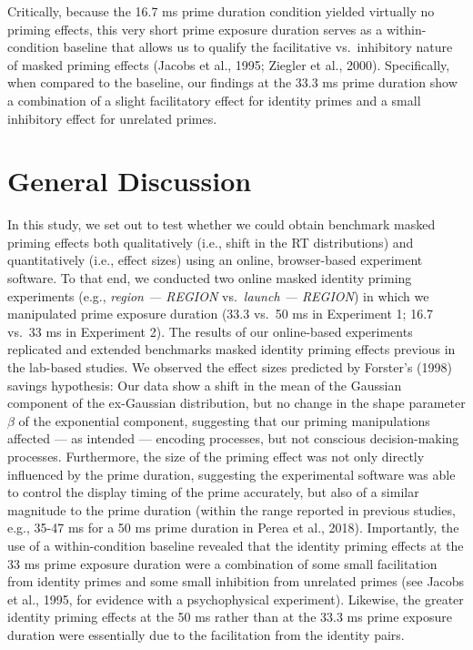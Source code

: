 \documentclass[
  english,
  man,floatsintext]{apa6}
\begin{document}
Critically, because the 16.7 ms prime duration condition yielded virtually no priming effects, this very short prime exposure duration serves as a within-condition baseline that allows us to qualify the facilitative vs.~inhibitory nature of masked priming effects (Jacobs et al., 1995; Ziegler et al., 2000). Specifically, when compared to the baseline, our findings at the 33.3 ms prime duration show a combination of a slight facilitatory effect for identity primes and a small inhibitory effect for unrelated primes.

\hypertarget{general-discussion}{%
\section{General Discussion}\label{general-discussion}}

In this study, we set out to test whether we could obtain benchmark masked priming effects both qualitatively (i.e., shift in the RT distributions) and quantitatively (i.e., effect sizes) using an online, browser-based experiment software. To that end, we conducted two online masked identity priming experiments (e.g., \emph{region --- REGION} vs.~\emph{launch --- REGION}) in which we manipulated prime exposure duration (33.3 vs.~50 ms in Experiment 1; 16.7 vs.~33 ms in Experiment 2). The results of our online-based experiments replicated and extended benchmarks masked identity priming effects previous in the lab-based studies. We observed the effect sizes predicted by Forster's (1998) savings hypothesis: Our data show a shift in the mean of the Gaussian component of the ex-Gaussian distribution, but no change in the shape parameter \(\beta\) of the exponential component, suggesting that our priming manipulations affected --- as intended --- encoding processes, but not conscious decision-making processes. Furthermore, the size of the priming effect was not only directly influenced by the prime duration, suggesting the experimental software was able to control the display timing of the prime accurately, but also of a similar magnitude to the prime duration (within the range reported in previous studies, e.g., 35-47 ms for a 50 ms prime duration in Perea et al., 2018). Importantly, the use of a within-condition baseline revealed that the identity priming effects at the 33 ms prime exposure duration were a combination of some small facilitation from identity primes and some small inhibition from unrelated primes (see Jacobs et al., 1995, for evidence with a psychophysical experiment). Likewise, the greater identity priming effects at the 50 ms rather than at the 33.3 ms prime exposure duration were essentially due to the facilitation from the identity pairs.
\end{document}
